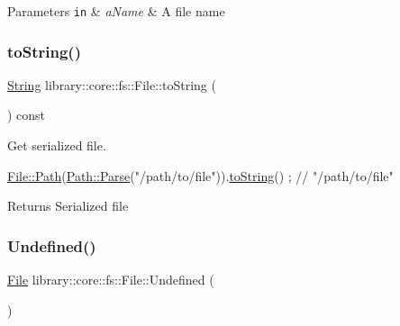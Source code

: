 \begin{DoxyParams}[1]{Parameters}
\mbox{\tt in}  & {\em a\+Name} & A file name \\
\hline
\end{DoxyParams}
\mbox{\label{classlibrary_1_1core_1_1fs_1_1_file_a891360e0ec67f357b528b3a1827d8c21}} 
\subsubsection{\texorpdfstring{to\+String()}{toString()}}
{\footnotesize\ttfamily \hyperlink{classlibrary_1_1core_1_1types_1_1_string}{String} library\+::core\+::fs\+::\+File\+::to\+String (\begin{DoxyParamCaption}{ }\end{DoxyParamCaption}) const}



Get serialized file. 


\begin{DoxyCode}
\hyperlink{classlibrary_1_1core_1_1fs_1_1_file_a72d6cdf8bb7e299889c6149e2b8a6cc7}{File::Path}(\hyperlink{classlibrary_1_1core_1_1fs_1_1_path_a6ba644b6609507e724c217bf2020f5ae}{Path::Parse}(\textcolor{stringliteral}{"/path/to/file"})).\hyperlink{classlibrary_1_1core_1_1fs_1_1_file_a891360e0ec67f357b528b3a1827d8c21}{toString}() ; \textcolor{comment}{// "/path/to/file"}
\end{DoxyCode}


\begin{DoxyReturn}{Returns}
Serialized file 
\end{DoxyReturn}
\mbox{\label{classlibrary_1_1core_1_1fs_1_1_file_af45fa5c36c359a979149845ef06586e6}} 
\subsubsection{\texorpdfstring{Undefined()}{Undefined()}}
{\footnotesize\ttfamily \hyperlink{classlibrary_1_1core_1_1fs_1_1_file}{File} library\+::core\+::fs\+::\+File\+::\+Undefined (\begin{DoxyParamCaption}{ }\end{DoxyParamCaption})\hspace{0.3cm}{\ttfamily [static]}}




